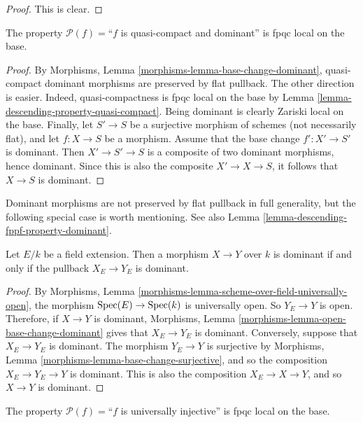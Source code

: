 \begin{proof}
This is clear.
\end{proof}

\begin{lemma}
\label{lemma-descending-property-dominant}
The property $\mathcal{P}(f) =$``$f$ is quasi-compact and dominant''
is fpqc local on the base.
\end{lemma}

\begin{proof}
By Morphisms, Lemma \ref{morphisms-lemma-base-change-dominant},
quasi-compact dominant morphisms are preserved
by flat pullback. The other direction is easier.
Indeed, quasi-compactness is fpqc local on the base
by Lemma \ref{lemma-descending-property-quasi-compact}.
Being dominant is clearly Zariski local on the base.
Finally, let $S' \to S$ be a surjective morphism of schemes
(not necessarily flat),
and let $f : X \to S$ be a morphism. Assume that the base change
$f' : X' \to S'$ is dominant. Then $X' \to S'\to S$ is a composite
of two dominant morphisms, hence dominant. Since this is also
the composite $X' \to X \to S$, it follows that $X\to S$ is dominant.
\end{proof}

\noindent
Dominant morphisms are not preserved by flat pullback in full generality,
but the following special case is worth mentioning.
See also Lemma \ref{lemma-descending-fppf-property-dominant}.

\begin{lemma}
\label{lemma-descending-property-dominant-over-field}
Let $E/k$ be a field extension. Then a morphism
$X \to Y$ over $k$ is dominant if and only if
the pullback $X_E \to Y_E$ is dominant.
\end{lemma}

\begin{proof}
By Morphisms,
Lemma \ref{morphisms-lemma-scheme-over-field-universally-open},
the morphism $\mathop{\mathrm{Spec}}(E) \to \mathop{\mathrm{Spec}}(k)$
is universally open. So $Y_E \to Y$ is open.
Therefore, if $X \to Y$ is dominant, Morphisms,
Lemma \ref{morphisms-lemma-open-base-change-dominant} gives that
$X_E \to Y_E$ is dominant.
Conversely, suppose that $X_E \to Y_E$ is dominant.
The morphism $Y_E \to Y$ is surjective by Morphisms,
Lemma \ref{morphisms-lemma-base-change-surjective}, and so the composition
$X_E \to Y_E \to Y$ is dominant. This is also the composition
$X_E \to X \to Y$, and so $X \to Y$ is dominant.
\end{proof}

\begin{lemma}
\label{lemma-descending-property-universally-injective}
The property $\mathcal{P}(f) =$``$f$ is universally injective''
is fpqc local on the base.
\end{lemma}


